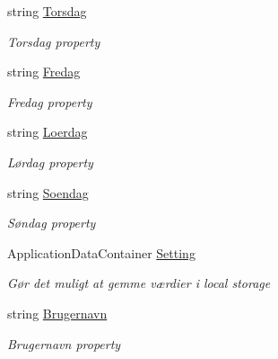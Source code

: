 \begin{DoxyCompactItemize}
string \hyperlink{class__1aarsproeve_1_1_view_model_1_1_vagtplan_view_model_a8ae90390ac0ead14c7542bb1b735ec75}{Torsdag}
\begin{DoxyCompactList}\small\item\em Torsdag property \end{DoxyCompactList}\item 
string \hyperlink{class__1aarsproeve_1_1_view_model_1_1_vagtplan_view_model_a7da74e228f974d9756603957477f65da}{Fredag}
\begin{DoxyCompactList}\small\item\em Fredag property \end{DoxyCompactList}\item 
string \hyperlink{class__1aarsproeve_1_1_view_model_1_1_vagtplan_view_model_aa7572363a0fffba490fb61060c922594}{Loerdag}
\begin{DoxyCompactList}\small\item\em Lørdag property \end{DoxyCompactList}\item 
string \hyperlink{class__1aarsproeve_1_1_view_model_1_1_vagtplan_view_model_abdd4c1e28095f4c2660a5ad71bab51ee}{Soendag}
\begin{DoxyCompactList}\small\item\em Søndag property \end{DoxyCompactList}\item 
Application\+Data\+Container \hyperlink{class__1aarsproeve_1_1_view_model_1_1_vagtplan_view_model_aa5e675ea6389cdc802698037ced2e091}{Setting}
\begin{DoxyCompactList}\small\item\em Gør det muligt at gemme værdier i local storage \end{DoxyCompactList}\item 
string \hyperlink{class__1aarsproeve_1_1_view_model_1_1_vagtplan_view_model_a2bb8421c370d9ff0ff1776a1c239ba4e}{Brugernavn}
\begin{DoxyCompactList}\small\item\em Brugernavn property \end{DoxyCompactList}\item 

\end{DoxyCompactItemize}
